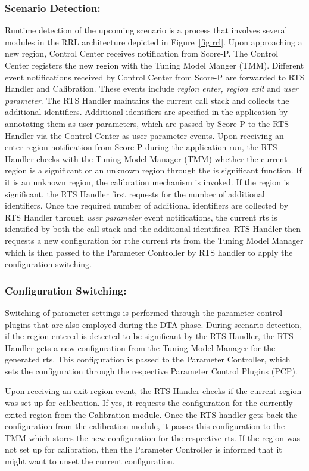\subsubsection{Scenario Detection:} Runtime detection of the upcoming scenario is a process that involves several modules in
the RRL architecture depicted in Figure~\ref{fig:rrl}. Upon approaching a new region, Control Center receives notification from Score-P. The Control Center registers the new region with the Tuning Model Manger (TMM). Different event notifications received by Control Center from Score-P are forwarded to RTS Handler and Calibration. These events include \textit{region enter, region exit} and \textit{user parameter}. The RTS Handler maintains the current call stack and collects the additional identifiers. Additional identifiers are specified in the application by annotating them as user parameters, which are passed by Score-P to the RTS Handler via the Control Center as user parameter events. Upon receiving an enter region notification from Score-P during the application run,
the RTS Handler checks with the Tuning Model Manager (TMM) whether the current region is a significant or an unknown region through the is significant function. If it is an unknown region, the calibration mechanism is invoked.
If the region is significant, the RTS Handler first requests for the number of additional identifiers. Once the required number of additional identifiers are collected by RTS Handler through \textit{user parameter} event notifications, the current rts is identified by both the call stack and the additional identifires. RTS Handler then requests a new configuration for rthe current rts from the Tuning Model Manager which is
then passed to the Parameter Controller by RTS handler to apply the configuration switching. 
\subsubsection{Configuration Switching:} Switching of parameter settings is performed through the parameter control plugins that are also employed during the DTA phase.
During scenario detection, if the region entered is detected to be significant by the RTS Handler, the RTS Handler gets a new configuration from the Tuning Model Manager for
the generated rts. This configuration is passed to the Parameter
Controller, which sets the configuration through the respective Parameter Control Plugins (PCP).

Upon receiving an exit region event, the RTS Hander checks if the current region was set up for calibration. If yes, it requests the configuration for the currently exited region from the
Calibration module. Once the RTS handler gets back the configuration from the calibration module, it passes this configuration to the TMM which stores the new configuration for the respective rts. If the region was not set up for calibration, then the Parameter Controller is informed that it might want to unset the current configuration. 

